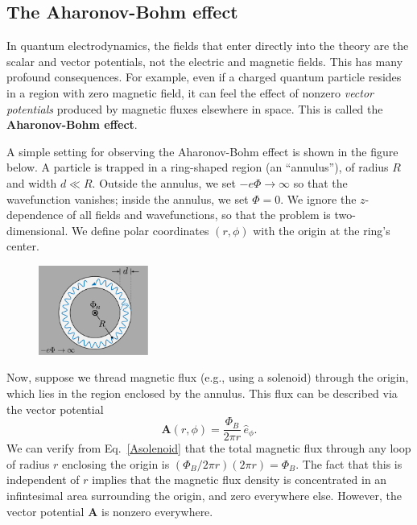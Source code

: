 \documentclass[pra,12pt]{revtex4}
\begin{document}
\subsection{The Aharonov-Bohm effect}

In quantum electrodynamics, the fields that enter directly into the
theory are the scalar and vector potentials, not the electric and
magnetic fields.  This has many profound consequences.  For example,
even if a charged quantum particle resides in a region with zero
magnetic field, it can feel the effect of nonzero \textit{vector
  potentials} produced by magnetic fluxes elsewhere in space.  This is
called the \textbf{Aharonov-Bohm effect}.

A simple setting for observing the Aharonov-Bohm effect is shown in
the figure below.  A particle is trapped in a ring-shaped region (an
``annulus''), of radius $R$ and width $d \ll R$.  Outside the annulus,
we set $-e\Phi\rightarrow\infty$ so that the wavefunction vanishes;
inside the annulus, we set $\Phi = 0$.  We ignore the $z$-dependence
of all fields and wavefunctions, so that the problem is
two-dimensional.  We define polar coordinates $(r,\phi)$ with the
origin at the ring's center.

\begin{figure}[h]
  \centering\includegraphics[width=0.32\textwidth]{annulus}
\end{figure}

Now, suppose we thread magnetic flux (e.g., using a solenoid) through
the origin, which lies in the region enclosed by the annulus.  This
flux can be described via the vector potential
\begin{equation}
  \mathbf{A}(r,\phi) = \frac{\Phi_B}{2\pi r} \, \hat{e}_\phi.
  \label{Asolenoid}
\end{equation}
We can verify from Eq.~\eqref{Asolenoid} that the total magnetic flux
through any loop of radius $r$ enclosing the origin is $(\Phi_B/2\pi
r)(2\pi r) = \Phi_B$.  The fact that this is independent of $r$
implies that the magnetic flux density is concentrated in an
infintesimal area surrounding the origin, and zero everywhere
else. However, the vector potential $\mathbf{A}$ is nonzero
everywhere.
\end{document}
